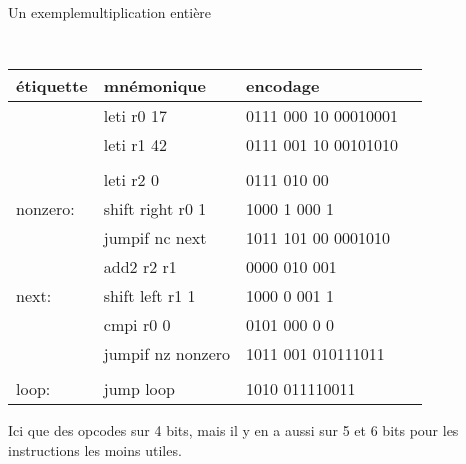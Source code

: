 \documentclass[slidetop,11pt,table]{beamer}
\begin{document}
\begin{frame}{Un exemple}{multiplication entière}
  \begin{center}
    \tt\small
    \begin{tabular}{llll}
      \textrm{étiquette} & \textrm{mnémonique} & \textrm{encodage}\\
      \hline
      
                         & leti	r0 17				 & 0111 000 10 00010001 \\
                         & leti	r1 42				 & 0111 001 10 00101010 \\
                         &									 &										 \\
                         & leti	r2 0				 & 0111 010 00				 \\
      nonzero: & shift	right r0 1 & 1000 1 000 1				 \\
                         & jumpif	nc next		 & 1011 101 00 0001010	 \\
                         & add2	r2 r1				 & 0000 010 001				 \\
      next:		 & shift	left r1 1	 & 1000 0 001 1				 \\
                         & cmpi	r0 0				 & 0101 000 0 0				 \\
                         & jumpif	nz nonzero & 1011 001 010111011	 \\
                         &									 &										 \\
      loop:		 & jump	loop				 & 1010 011110011			 \\
    \end{tabular}
  \end{center}
  Ici que des opcodes sur 4 bits, mais il y en a aussi sur 5 et 6 bits pour les instructions les moins utiles.
\end{frame}
\end{document}
